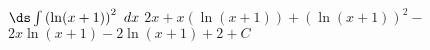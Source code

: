 {$\ds \int \left(\ln (x+1)\right)^2\ dx$}
{$2 x+x \left(\ln (x+1)\right)+\left(\ln (x+1)\right)^2-$ $2 x \ln (x+1)-2 \ln (x+1)+2+C$
}

